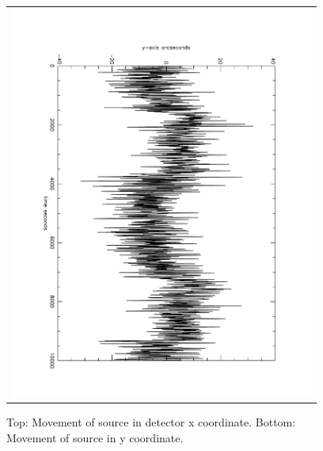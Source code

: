 \begin{figure}
\begin{tabular}{c}
\includegraphics[width=10cm, angle=90]{images/jitter_y.pdf} 
\end{tabular}
\label{jitterfig}
\caption{Top: Movement of source in detector x coordinate. Bottom: Movement of source in y coordinate.}
\end{figure}

%